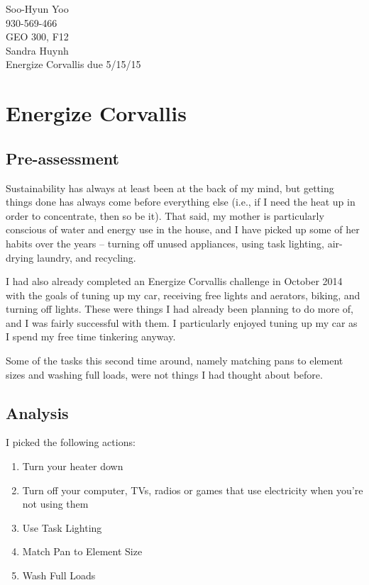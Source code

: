 \documentclass[12pt,letterpaper]{article}
\begin{document}
Soo-Hyun Yoo \\
930-569-466 \\
GEO 300, F12 \\
Sandra Huynh \\
Energize Corvallis due 5/15/15

\section*{Energize Corvallis}

\subsection*{Pre-assessment}

Sustainability has always at least been at the back of my mind, but getting
things done has always come before everything else (i.e., if I need the heat up
in order to concentrate, then so be it). That said, my mother is particularly
conscious of water and energy use in the house, and I have picked up some of
her habits over the years -- turning off unused appliances, using task
lighting, air-drying laundry, and recycling.

I had also already completed an Energize Corvallis challenge in October 2014
with the goals of tuning up my car, receiving free lights and aerators, biking,
and turning off lights. These were things I had already been planning to do
more of, and I was fairly successful with them. I particularly enjoyed tuning
up my car as I spend my free time tinkering anyway.

Some of the tasks this second time around, namely matching pans to element
sizes and washing full loads, were not things I had thought about before.

\subsection*{Analysis}

I picked the following actions:

\begin{enumerate}
  \item Turn your heater down
  \item Turn off your computer, TVs, radios or games that use electricity when
    you're not using them
  \item Use Task Lighting
  \item Match Pan to Element Size
  \item Wash Full Loads
\end{enumerate}
\end{document}
